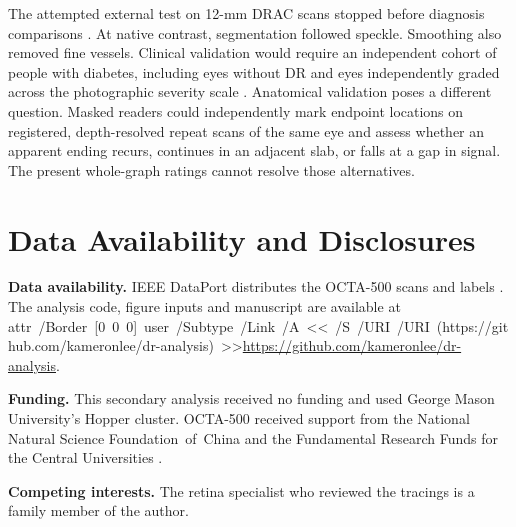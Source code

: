 \documentclass[letterpaper]{article}
\begin{document}
The attempted external test on 12-mm DRAC scans stopped before diagnosis comparisons \citep{qian2024drac}. At native contrast, segmentation followed speckle. Smoothing also removed fine vessels. Clinical validation would require an independent cohort of people with diabetes, including eyes without DR and eyes independently graded across the photographic severity scale \citep{etdrs1991grading}. Anatomical validation poses a different question. Masked readers could independently mark endpoint locations on registered, depth-resolved repeat scans of the same eye and assess whether an apparent ending recurs, continues in an adjacent slab, or falls at a gap in signal. The present whole-graph ratings cannot resolve those alternatives.

\section{Data Availability and Disclosures}
\noindent\textbf{Data availability.} IEEE DataPort distributes the OCTA-500 scans and labels \citep{li2024octa500}. The analysis code, figure inputs and manuscript are available at \mbox{\pdfstartlink attr {/Border [0 0 0]} user {/Subtype /Link /A << /S /URI /URI (https://github.com/kameronlee/dr-analysis) >>}\url{https://github.com/kameronlee/dr-analysis}\pdfendlink}. 

\begin{samepage}\noindent\textbf{Funding.} This secondary analysis received no funding and used George Mason University's Hopper cluster. OCTA-500 received support from the National Natural Science \mbox{Foundation of China} and the Fundamental Research Funds for the Central Universities \citep{li2024octa500}.\par\end{samepage}

\noindent\textbf{Competing interests.} The retina specialist who reviewed the tracings is a family member of the author.


\end{document}
